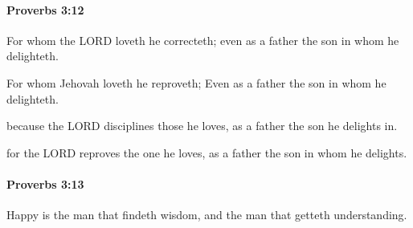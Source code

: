 		\paragraph{Proverbs 3:12} %
			\label{PROVERBS-3-12}

			For whom the LORD loveth he correcteth; even as a father the son in whom he delighteth.

			\begin{versebox}
					\item[BHS] 
					\item[ASV] For whom Jehovah loveth he reproveth; Even as a father the son in whom he delighteth.
					\item[NIV] because the LORD disciplines those he loves, as a father the son he delights in.
					\item[NRSV] for the LORD reproves the one he loves, as a father the son in whom he delights.
			\end{versebox}

		\paragraph{Proverbs 3:13} %
			\label{PROVERBS-3-13}

			Happy is the man that findeth wisdom, and the man that getteth understanding.

